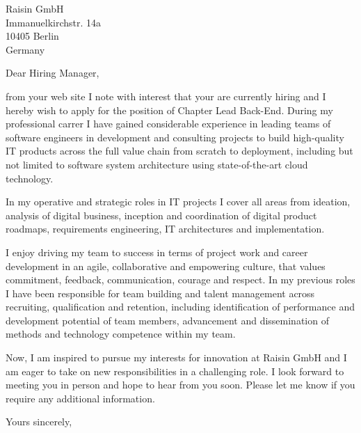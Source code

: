 \documentclass[10pt,a4paper]{dinbrief}
\date{\today}
\begin{document}
 
\begin{letter}  
{%
	Raisin GmbH\\
	Immanuelkirchstr. 14a\\
	10405 Berlin\\
	Germany	
}
\subject{\bf Job Application Chapter Lead Back-End}
\opening{Dear Hiring Manager,}

from your web site I note with interest that your are currently hiring and I hereby wish to apply for the position of Chapter Lead Back-End. During my professional carrer I have gained considerable experience in leading teams of software engineers in development and consulting projects to build high-quality IT products across the full value chain from scratch to deployment, including but not limited to software system architecture using state-of-the-art cloud technology. 

In my operative and strategic roles in IT projects I cover all areas from ideation, analysis of digital business, inception and coordination of digital product roadmaps, requirements engineering, IT architectures and implementation. 

I enjoy driving my team to success in terms of project work and career development in an agile, collaborative and empowering culture, that values commitment, feedback, communication, courage and respect. In my previous roles I have been responsible for team building and talent management across recruiting, qualification and retention, including identification of performance and development potential of team members, advancement and dissemination of methods and technology competence within my team.

Now, I am inspired to pursue my interests for innovation at Raisin GmbH and I am eager to take on new responsibilities in a challenging role. I look forward to meeting you in person and hope to hear from you soon. Please let me know if you require any additional information.

\closing{Yours sincerely,}
\end{letter}
\end{document}
